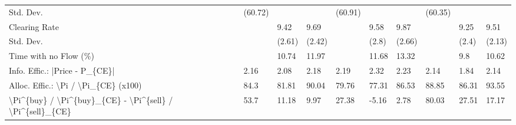 \begin{tabular}{llllllllll}
 Std. Dev.                                                 & (60.72)  &          &          & (60.91)  &          &          & (60.35)   &           &           \\
 Clearing Rate                                             &          & 9.42     & 9.69     &          & 9.58     & 9.87     &           & 9.25      & 9.51      \\
 Std. Dev.                                                 &          & (2.61)   & (2.42)   &          & (2.8)    & (2.66)   &           & (2.4)     & (2.13)    \\
 Time with no Flow (\%)                                     &          & 10.74    & 11.97    &          & 11.68    & 13.32    &           & 9.8       & 10.62     \\
 Info. Effic.: |Price - P\_\{CE\}|                            & 2.16     & 2.08     & 2.18     & 2.19     & 2.32     & 2.23     & 2.14      & 1.84      & 2.14      \\
 Alloc. Effic.: \textbackslash{}Pi / \textbackslash{}Pi\_\{CE\} (x100)                      & 84.3     & 81.81    & 90.04    & 79.76    & 77.31    & 86.53    & 88.85     & 86.31     & 93.55     \\
 \textbackslash{}Pi\^{}\{buy\} / \textbackslash{}Pi\^{}\{buy\}\_\{CE\} - \textbackslash{}Pi\^{}\{sell\} / \textbackslash{}Pi\^{}\{sell\}\_\{CE\} & 53.7     & 11.18    & 9.97     & 27.38    & -5.16    & 2.78     & 80.03     & 27.51     & 17.17     \\
\hline
\end{tabular}